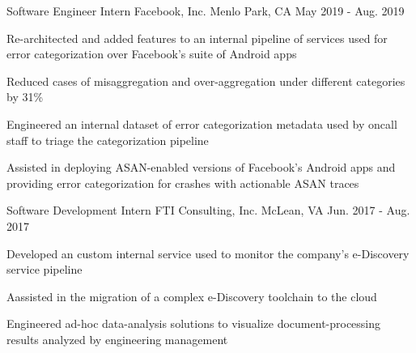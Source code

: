 


\begin{cventries}

  
  \cventry
  {Software Engineer Intern} %
  {Facebook, Inc.} %
  {Menlo Park, CA} %
  {May 2019 - Aug. 2019} %
  { %
    \begin{cvitems}
    \item {Re-architected and added features to an internal pipeline of services used for error categorization over Facebook's suite of Android apps}
    \item {Reduced cases of misaggregation and over-aggregation under different categories by 31\%}
    \item {Engineered an internal dataset of error categorization metadata used by oncall staff to triage the categorization pipeline}
    \item {Assisted in deploying ASAN-enabled versions of Facebook's Android apps and providing error categorization for crashes with actionable ASAN traces}
    \end{cvitems}
  }
  
  \cventry
  {Software Development Intern} %
  {FTI Consulting, Inc.} %
  {McLean, VA} %
  {Jun. 2017 - Aug. 2017} %
  { %
    \begin{cvitems}
    \item {Developed an custom internal service used to monitor the company's e-Discovery service pipeline}
    \item {Aassisted in the migration of a complex e-Discovery toolchain to the cloud}
    \item {Engineered ad-hoc data-analysis solutions to visualize document-processing results analyzed by engineering management}
    \end{cvitems}
  }
\end{cventries}
